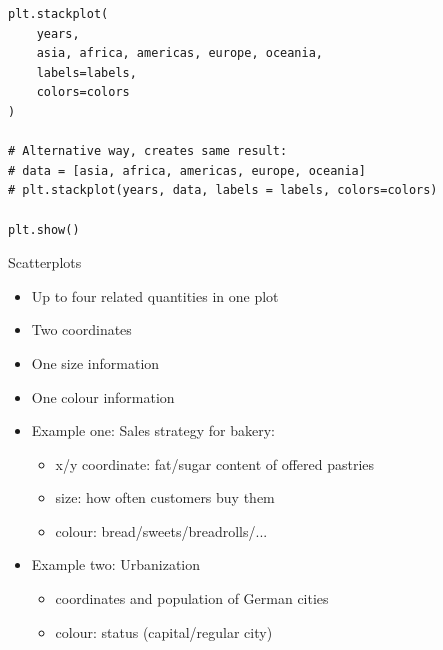 
\begin{frame}[fragile]
%
\begin{codebox}[... continued]
\begin{verbatim}
plt.stackplot(
    years,
    asia, africa, americas, europe, oceania,
    labels=labels,
    colors=colors
)

# Alternative way, creates same result:
# data = [asia, africa, americas, europe, oceania]
# plt.stackplot(years, data, labels = labels, colors=colors)

plt.show()
\end{verbatim}
\end{codebox}
%
\end{frame}


\begin{frame}{Scatterplots}
%
\begin{itemize}
\item Up to four related quantities in one plot
\item Two coordinates
\item One size information
\item One colour information
\item Example one: Sales strategy for bakery:
	\begin{itemize}
	\item x/y coordinate: fat/sugar content of offered pastries
	\item size: how often customers buy them
	\item colour: bread/sweets/breadrolls/...
	\end{itemize}
\item Example two: Urbanization
	\begin{itemize}
	\item coordinates and population of German cities
	\item colour: status (capital/regular city)
	\end{itemize}
\end{itemize}
%
\end{frame}


